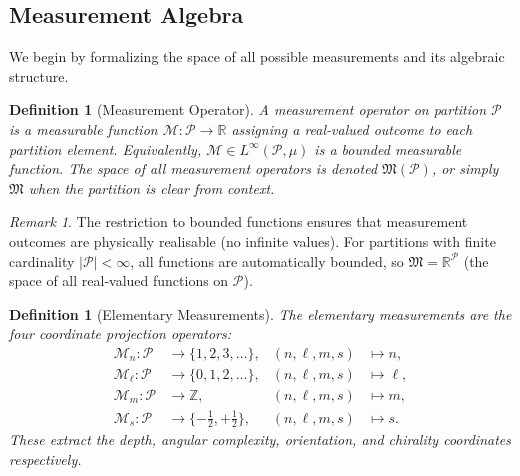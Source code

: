 \documentclass[twocolumn,10pt,a4paper]{article}
\newtheorem{definition}[theorem]{Definition}
\theoremstyle{remark}
\newtheorem{remark}[theorem]{Remark}
\newcommand{\partition}{\mathcal{P}}
\newcommand{\Reals}{\mathbb{R}}
\newcommand{\Integers}{\mathbb{Z}}
\begin{document}
\subsection{Measurement Algebra}

We begin by formalizing the space of all possible measurements and its algebraic structure.

\begin{definition}[Measurement Operator]
\label{def:measurement_operator}
A \emph{measurement operator} on partition $\partition$ is a measurable function $\mathcal{M}: \partition \to \Reals$ assigning a real-valued outcome to each partition element. Equivalently, $\mathcal{M} \in L^\infty(\partition, \mu)$ is a bounded measurable function. The space of all measurement operators is denoted $\mathfrak{M}(\partition)$, or simply $\mathfrak{M}$ when the partition is clear from context.
\end{definition}

\begin{remark}
The restriction to bounded functions ensures that measurement outcomes are physically realisable (no infinite values). For partitions with finite cardinality $|\partition| < \infty$, all functions are automatically bounded, so $\mathfrak{M} = \Reals^\partition$ (the space of all real-valued functions on $\partition$).
\end{remark}

\begin{definition}[Elementary Measurements]
\label{def:elementary_measurements}
The \emph{elementary measurements} are the four coordinate projection operators:
\begin{align}
\mathcal{M}_n: \partition &\to \{1, 2, 3, \ldots\}, & (n, \ell, m, s) &\mapsto n, \\
\mathcal{M}_\ell: \partition &\to \{0, 1, 2, \ldots\}, & (n, \ell, m, s) &\mapsto \ell, \\
\mathcal{M}_m: \partition &\to \Integers, & (n, \ell, m, s) &\mapsto m, \\
\mathcal{M}_s: \partition &\to \{-\tfrac{1}{2}, +\tfrac{1}{2}\}, & (n, \ell, m, s) &\mapsto s.
\end{align}
These extract the depth, angular complexity, orientation, and chirality coordinates respectively.
\end{definition}
\end{document}
